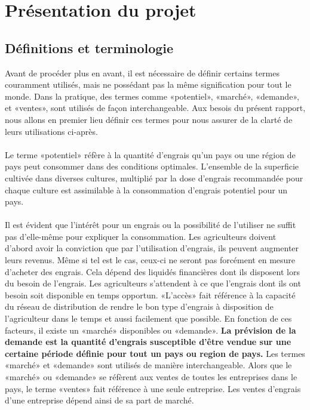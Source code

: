 \section{Présentation du projet}
	\subsection{Définitions et terminologie}
	Avant de procéder plus en avant, il est nécessaire de définir certains termes couramment utilisés, mais ne possédant pas la même signification pour tout le monde. Dans la pratique, des termes comme «potentiel», «marché», «demande», et «ventes», sont utilisés de façon interchangeable. Aux besois du présent rapport, nous allons en premier lieu définir ces termes pour nous assurer de la clarté de leurs utilisations ci-après.
	\paragraph*{}
	Le terme «potentiel»  réfère à la quantité d'engrais qu'un pays ou une région de pays peut consommer dans des conditions optimales. L'ensemble de la superficie cultivée dans diverses cultures, multiplié par la dose d'engrais recommandée pour chaque culture est assimilable à la consommation d'engrais potentiel pour un pays.
	\paragraph*{}
	Il est évident que l'intérêt pour un engrais ou la possibilité de l'utiliser ne suffit pas d'elle-même pour expliquer la consommation. Les agriculteurs doivent d'abord avoir la conviction que par l'utilisation d'engrais, ils peuvent augmenter leurs revenus. Même si tel est le cas, ceux-ci ne seront pas forcément en mesure d'acheter des engrais. Cela dépend des liquidés financières dont ils disposent lors du besoin de l'engrais.
	Les agriculteurs s'attendent à ce que l'engrais dont ils ont besoin soit disponible en temps opportun. «L'accès» fait référence à la capacité du réseau de distribution de rendre le bon type d'engrais à disposition de l'agriculteur dans le temps et aussi facilement que possible. En fonction de ces facteurs, il existe un «marché» disponibles ou «demande». \textbf{La prévision de la demande est la quantité d'engrais susceptible d'être vendue sur une certaine période définie pour tout un pays ou region de pays.} Les termes «marché» et «demande» sont utilisés de manière interchangeable. Alors que le «marché» ou «demande» se réfèrent aux ventes de toutes les entreprises dans le pays, le terme «ventes» fait référence à une seule entreprise. Les ventes d'engrais d'une entreprise dépend ainsi de sa part de marché.
